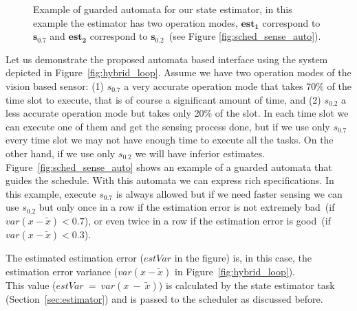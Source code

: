 \documentclass[ twoside, 12pt ]{article}
\begin{document}
{\begin{figure}[]
    \centering
    
    
    \caption{Example of guarded automata for our state estimator, in this example the estimator has two operation modes, $\mathbf{est_1}$ correspond to $\mathbf{s_{0.7}}$ and $\mathbf{est_2}$ correspond to $\mathbf{s_{0.2}}$~(see Figure \ref{fig:sched_sense_auto}).
        \label{fig:sched_estimator_auto}}
\end{figure}

Let us demonstrate the proposed automata based interface using the system depicted in Figure~\ref{fig:hybrid_loop}.
Assume we have two operation modes of the vision based sensor: (1) $s_{0.7}$ a very accurate operation mode that takes 70\% of the time slot to execute, that is of course a significant amount of time, and (2) $s_{0.2}$ a less accurate operation mode but takes only 20\% of the slot.
In each time slot we can execute one of them and get the sensing process done, but if we use only $s_{0.7}$ every time slot we may not have enough time to execute all the tasks. On the other hand, if we use only $s_{0.2}$ we will have inferior estimates.
Figure~\ref{fig:sched_sense_auto} shows an example of a guarded automata that guides the schedule. With this automata we can express rich specifications. 
In this example, execute $s_{0.7}$ is always allowed but if we need faster sensing we can use $s_{0.2}$ but only once in a row if the estimation error is not extremely bad~(if~$var(x-\tilde{x}) < 0.7$), or even twice in a row if the estimation error is good~(if~$var(x-\tilde{x}) < 0.3$).

The estimated estimation error ($estVar$ in the figure) is, in this case, the estimation error variance ($var(x-\tilde{x})$ in Figure~\ref{fig:hybrid_loop}). 
\\This value ($estVar~=~var(x~-~\tilde{x})$) is calculated by the state estimator task (Section~\ref{sec:estimator}) and is passed to the scheduler as discussed before.

}
\end{document}
